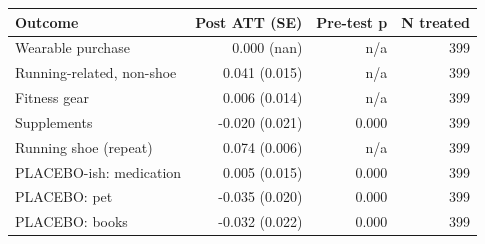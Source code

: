 \begin{tabular}{lrrr}
\toprule
Outcome & Post ATT (SE) & Pre-test p & N treated \\
\midrule
Wearable purchase & 0.000 (nan) & n/a & 399 \\
Running-related, non-shoe & 0.041 (0.015) & n/a & 399 \\
Fitness gear & 0.006 (0.014) & n/a & 399 \\
Supplements & -0.020 (0.021) & 0.000 & 399 \\
Running shoe (repeat) & 0.074 (0.006) & n/a & 399 \\
PLACEBO-ish: medication & 0.005 (0.015) & 0.000 & 399 \\
PLACEBO: pet & -0.035 (0.020) & 0.000 & 399 \\
PLACEBO: books & -0.032 (0.022) & 0.000 & 399 \\
\bottomrule
\end{tabular}
